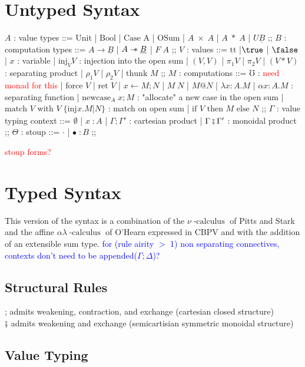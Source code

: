 \documentclass{article}
\makeatletter
\newcommand{\blue}[1]{\textcolor{blue}{#1}}
\newcommand{\red}[1]{\textcolor{red}{#1}}
\newcommand{\sep}{\mathrel{-\mkern-6mu*}}
\newcommand{\thunk}[1]{\textrm{thunk }#1}
\newcommand{\injj}[2]{\textrm{inj}_{#1}#2}
\newcommand{\err}{\mho}
\newcommand{\force}[1]{\textrm{force }#1}
\newcommand{\ret}[1]{\textrm{ret }#1}
\newcommand{\bind}[3]{#1 \leftarrow #2 ; #3}
\newcommand{\newcase}[3]{\textrm{newcase}_{#1} \; #2 ; #3}
\newcommand{\match}[5]{\textrm{match }#1 \textrm{ with }#2 \;\{#3 . #4 | #5\}}
\newcommand{\lett}[4]{\textrm{let }(#1,#2) = #3 ; #4}
\newcommand{\lets}[4]{\textrm{let }(#1*#2) = #3 ; #4}
\newcommand{\ite}[3]{\textrm{if }#1 \textrm{ then }#2 \textrm{ else }#3}
\newcommand{\at}{\textrm{@}}
\newcommand{\ttt}{\textrm{tt}}
\newcommand{\calculus}{\operatorname{-calculus}}
\makeatother
\begin{document}
\section{Untyped Syntax}
\begin{bnf}
$A$ : value types ::= $\textrm{Unit}$
| $\textrm{Bool}$
| $\textrm{Case A}$ 
| $\textrm{OSum}$
| $A\; \times \; A$  
| $A\; * \; A$
| $U\underline{B}$
;;
$B$ : computation types ::= $A \rightarrow \underline{B}$ 
| $A \sep \underline{B}$
| $F\;A$
;;
$V$ : values ::= $\ttt$
|$\true$
| $\false$
| $x$ : variable
| $\injj{V}{V}$ : injection into the open sum
| $(V,V)$
| $\pi_1 V$
| $\pi_2 V$
| $(V*V)$ : separating product
| $\rho_1 V$
| $\rho_2 V$
| $\thunk{M}$
;;
$M$ : computations ::= $\err$ : \red{need monad for this}
| $\force{V}$
| $\ret{V}$
| $\bind{x}{M}{N}$
| $M \; N$
| $M \at N$
| $\lambda x \colon A . M$
| $\alpha x \colon A . M$ : separating function
| $\newcase{A}{x}{M}$ : "allocate" a new case in the open sum
| $\match{V}{V}{\injj{}{x}}{M}{N}$ : match on open sum
| $\ite{V}{M}{N}$
;;
$\Gamma$ : value typing context ::= $\emptyset$ 
| $ x \; \colon A$
| $\Gamma ; \Gamma'$ : cartesian product
| $\Gamma \fatsemi \Gamma'$ : monoidal product
;;
$\Theta$ : stoup ::= $\cdot$ 
| $\bullet \; \colon B$
;;
\end{bnf}
\red{stoup forms?}
\begin{comment}
    | $\lett{x}{y}{V}{M}$
| $\lets{x}{y}{V}{M}$
\end{comment}

\newpage
\section{Typed Syntax}
This version of the syntax is a combination of the $\nu\calculus$\cite{stark:namerp-tlca}
\cite{starkCategoricalModelsLocal1996} of Pitts and Stark and the affine $\alpha\lambda\calculus$ of O'Hearn 
\cite{ohearnResourceInterpretationsBunched1999} expressed in CBPV and with the addition of an extensible sum type.
\blue{for (rule airity $>$ 1) non separating connectives, contexts don't need to be appended($\Gamma ; \Delta$)?}
\subsection{Structural Rules}
; admits weakening, contraction, and exchange (cartesian closed structure)\\
$\fatsemi$ admits weakening and exchange (semicartisian symmetric monoidal structure)
\subsection{Value Typing}
\end{document}
